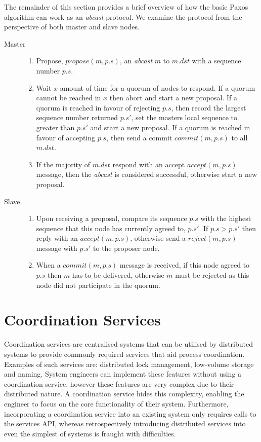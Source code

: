 		The remainder of this section provides a brief overview of how the basic Paxos algorithm can work as an \emph{abcast} protocol.  We examine the protocol from the perspective of both master and slave nodes.  
		
		\begin{description}
		    \item[Master] \hfill
			    \begin{enumerate}
		  			\item Propose, $propose(m, p.s)$, an \emph{abcast} $m$ to $m.dst$ with a sequence number $p.s$.
		  			\item Wait $x$ amount of time for a quorum of nodes to respond.  If a quorum cannot be reached in $x$ then abort and start a new proposal.  If a quorum is reached in favour of rejecting $p.s$, then record the largest sequence number returned $p.s'$, set the masters local sequence to greater than $p.s'$ and start a new proposal.  If a quorum is reached in favour of accepting $p.s$, then send a commit $commit(m, p.s)$ to all $m.dst$.  
		  			\item If the majority of $m.dst$ respond with an accept $accept(m, p.s)$ message, then the \emph{abcast} is considered successful, otherwise start a new proposal.  
			\end{enumerate}
			
			
			\item[Slave] \hfill
				\begin{enumerate}
		  			\item Upon receiving a proposal, compare its sequence $p.s$ with the highest sequence that this node has currently agreed to, $p.s'$.  If $p.s > p.s'$ then reply with an $accept(m, p.s)$, otherwise send a $reject(m, p.s)$ message with $p.s'$ to the proposer node.  
		  			\item When a $commit(m, p.s)$ message is received, if this node agreed to $p.s$ then $m$ has to be delivered, otherwise $m$ must be rejected as this node did not participate in the quorum.  
				\end{enumerate}		
		\end{description}
		
\section{Coordination Services}\label{sec:coordination}
Coordination services are centralised systems that can be utilised by distributed systems to provide commonly required services that aid process coordination. Examples of such services are: distributed lock management, low-volume storage and naming. System engineers can implement these features without using a coordination service, however these features are very complex due to their distributed nature\citep{Burrows:2006:CLS:1298455.1298487}. A coordination service hides this complexity, enabling the engineer to focus on the core functionality of their system. Furthermore, incorporating a coordination service into an existing system only requires calls to the services API, whereas retrospectively introducing distributed services into even the simplest of systems is fraught with difficulties. 

